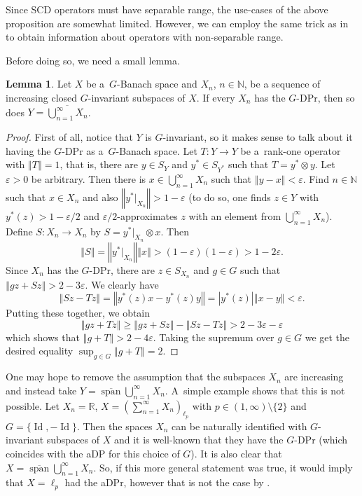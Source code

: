 \documentclass[a4paper,12pt]{amsart}
\theoremstyle{definition}
\newtheorem{lemma}[theorem]{Lemma}
\theoremstyle{definition}
\theoremstyle{remark}
\numberwithin{equation}{section}
\newcommand{\R}{\mathbb{R}}
\newcommand{\N}{\mathbb{N}}
\DeclareMathOperator{\id}{Id}
\renewcommand{\geq}{\geqslant}
\newcommand{\<}{\langle}
\renewcommand{\>}{\rangle}
\newcommand{\norm}[1]{\left\Vert#1\right\Vert}
\newcommand{\abs}[1]{\left\vert#1\right\vert}
\newcommand{\e}{\varepsilon}
\newcommand{\eps}{\e}
\newcommand{\clspan}{\overline{\operatorname{span}}}
\begin{document}
	Since SCD operators must have separable range, the use-cases of the above proposition are somewhat limited. However, we can employ the same trick as in \cite[Corollary~5.5]{AKMMS} to obtain information about operators with non-separable range.
	
	Before doing so, we need a small lemma.
	\begin{lemma} \label{prop:stabilityForIncreasingSeqOfSubspaces}
		Let $X$ be a~$G$-Banach space and $X_n$, $n \in \N$, be a sequence of increasing closed $G$-invariant subspaces of $X$. If every $X_n$ has the $G$-DPr, then so does $Y = \overline{\bigcup_{n=1}^\infty X_n}$.
	\end{lemma}
	\begin{proof}
		First of all, notice that $Y$ is $G$-invariant, so it makes sense to talk about it having the $G$-DPr as a~$G$-Banach space. Let $T: Y \to Y$ be a~rank-one operator with $\norm{T} = 1$, that is, there are $y \in S_Y$ and $y^* \in S_{Y^*}$ such that $T = y^* \otimes y$. Let $\eps > 0$ be arbitrary. Then there is $x \in \bigcup_{n=1}^\infty X_n$ such that $\norm{y-x} < \eps$. Find $n \in \N$ such that $x \in X_n$ and also $\norm{y^*|_{X_n}} > 1-\eps$ (to do so, one finds $z \in Y$ with $y^*(z) > 1-\eps/2$ and $\eps/2$-approximates $z$ with an element from $\bigcup_{n=1}^\infty X_n$). Define $S: X_n \to X_n$ by $S = y^*|_{X_n} \otimes x$. Then
		\begin{equation*}
			\norm{S} = \norm{y^*|_{X_n}} \norm{x} > (1-\eps)(1-\eps) > 1-2\eps.
		\end{equation*}
		Since $X_n$ has the $G$-DPr, there are $z \in S_{X_n}$ and $g \in G$ such that $\norm{gz + Sz} > 2 - 3\eps$.
		We clearly have
		\begin{equation*}
			\norm{Sz - Tz}
			= \norm{y^*(z)x - y^*(z)y}
			= \abs{y^*(z)}\norm{x-y}
			< \eps.
		\end{equation*}
		Putting these together, we obtain
		\begin{equation*}
			\norm{gz + Tz} \geq \norm{gz + Sz} - \norm{Sz - Tz} > 2-3\eps - \eps
		\end{equation*}
		which shows that $\norm{g+T} > 2 - 4\eps$. Taking the supremum over $g \in G$ we get the desired equality $\sup_{g \in G} \norm{g + T} = 2$.
	\end{proof}
	
	One may hope to remove the assumption that the subspaces $X_n$ are increasing and instead take $Y = \clspan \bigcup_{n=1}^\infty X_n$. A~simple example shows that this is not possible. Let $X_n = \R$, $X = (\sum_{n=1}^\infty X_n)_{\ell_p}$ with $p \in (1, \infty) \setminus \{2\}$ and $G = \{\id, -\id\}$. Then the spaces $X_n$ can be naturally identified with $G$-invariant subspaces of $X$ and it is well-known that they have the $G$-DPr (which coincides with the aDP for this choice of $G$). It is also clear that $X = \clspan \bigcup_{n=1}^\infty X_n$. So, if this more general statement was true, it would imply that $X = \ell_p$ had the aDPr, however that is not the case by .
	
\end{document}
